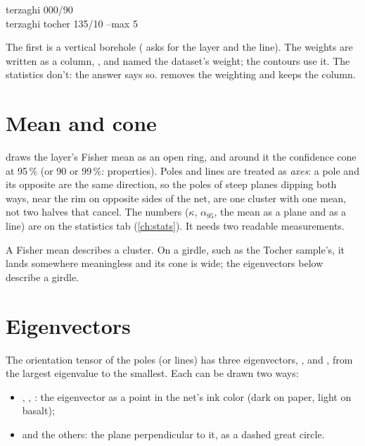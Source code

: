 \begin{center}\small\ttfamily
terzaghi 000/90\\
terzaghi tocher 135/10 --max 5
\end{center}

\noindent The first is a vertical borehole ( asks for the layer and
the line). The weights are written as a column, , and
named the dataset's weight; the contours use it. The statistics don't: the answer says so.
 removes the weighting and keeps the column.

\section{Mean and cone}\label{sec:mean}

 draws the layer's Fisher mean \parencite{fisher1953} as an open ring, and around it the
confidence cone at 95\,\% (or 90 or 99\,\%: properties). Poles and lines are treated as \emph{axes}: a pole
and its opposite are the same direction, so the poles of steep planes dipping both ways, near the rim on
opposite sides of the net, are one cluster with one mean, not two halves that cancel. The numbers
($\kappa$, $\alpha_{95}$, the mean as a plane and as a line) are on the statistics tab
(\cref{ch:stats}). It needs two readable measurements.

\begin{note}
A Fisher mean describes a cluster. On a girdle, such as the Tocher sample's, it lands somewhere
meaningless and its cone is wide; the eigenvectors below describe a girdle.
\end{note}

\section{Eigenvectors}\label{sec:eigen}

The orientation tensor of the poles (or lines) has three eigenvectors, ,  and ,
from the largest eigenvalue to the smallest. Each can be drawn two ways:

\begin{itemize}
\item {}, , : the eigenvector as a point in the net's ink color (dark on paper,
light on basalt);
\item {} and the others: the plane perpendicular to it, as a dashed great circle.
\end{itemize}

